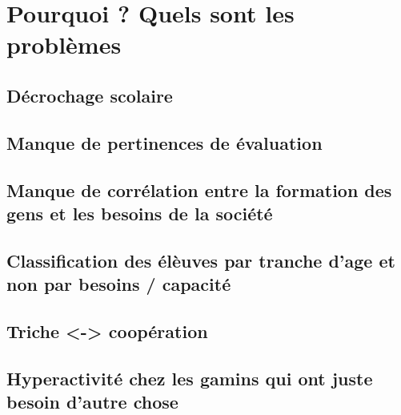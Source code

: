 
\chapter{Pourquoi ? Quels sont les problèmes}

\section{Décrochage scolaire}
\section{Manque de pertinences de évaluation}
\section{Manque de corrélation entre la formation des gens et les besoins de la société}
\section{Classification des élèuves par tranche d'age et non par besoins / capacité}
\section{Triche <-> coopération}
\section{Hyperactivité chez les gamins qui ont juste besoin d'autre chose}



